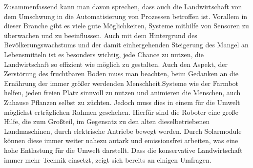 Zusammenfassend kann man davon sprechen, dass auch die Landwirtschaft von dem
Umschwung in die Automatisierung von Prozessen betroffen ist. Vorallem in
dieser Branche gibt es viele gute Möglichkeiten, Systeme mithilfe von Sensoren
zu überwachen und zu beeinflussen. Auch mit dem Hintergrund des
Bevölkerungswachstums und der damit einhergehenden Steigerung des Mangel an
Lebensmitteln ist es besonders wichtig, jede Chance zu nutzen, die
Landwirtschaft so effizient wie möglich zu gestalten. Auch den Aspekt, der
Zerstörung des fruchtbaren Boden muss man beachten, beim Gedanken an die
Ernährung der immer größer werdenden Menschheit.\cite{rainer2003diskurs}Systeme
wie der Farmbot helfen, jeden freien Platz sinnvoll zu nutzen und animieren die
Menschen, auch Zuhause Pflanzen selbst zu züchten. Jedoch muss dies in einem
für die Umwelt möglichst erträglichen Rahmen geschehen. Hierfür sind die
Roboter eine große Hilfe, die zum Großteil, im Gegensatz zu den alten
dieselbetriebenen Landmaschinen, durch elektrische Antriebe bewegt werden.
Durch Solarmodule können diese immer weiter nahezu autark und emissionsfrei
arbeiten, was eine hohe Entlastung für die Umwelt darstellt. Dass die
konservative Landwirtschaft immer mehr Technik einsetzt, zeigt sich bereits an
einigen Umfragen.
